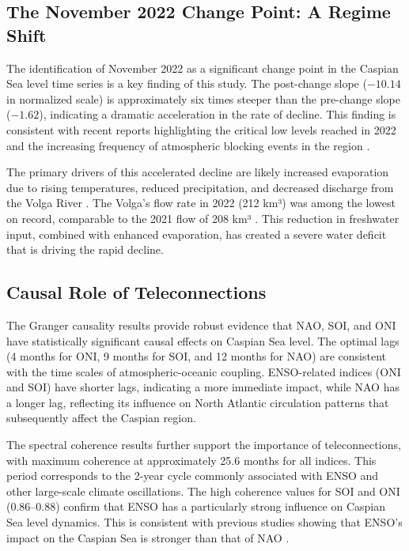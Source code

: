 \documentclass[12pt,a4paper,twocolumn]{article}
\begin{document}
\subsection{The November 2022 Change Point: A Regime Shift}

The identification of November 2022 as a significant change point in the Caspian Sea level time series is a key finding of this study. The post-change slope ($-10.14$ in normalized scale) is approximately six times steeper than the pre-change slope ($-1.62$), indicating a dramatic acceleration in the rate of decline. This finding is consistent with recent reports highlighting the critical low levels reached in 2022 and the increasing frequency of atmospheric blocking events in the region \citep{cabar2024, springer2025}.

The primary drivers of this accelerated decline are likely increased evaporation due to rising temperatures, reduced precipitation, and decreased discharge from the Volga River \citep{channelnewsasia2024}. The Volga's flow rate in 2022 (212 km³) was among the lowest on record, comparable to the 2021 flow of 208 km³ \citep{cabar2023}. This reduction in freshwater input, combined with enhanced evaporation, has created a severe water deficit that is driving the rapid decline.

\subsection{Causal Role of Teleconnections}

The Granger causality results provide robust evidence that NAO, SOI, and ONI have statistically significant causal effects on Caspian Sea level. The optimal lags (4 months for ONI, 9 months for SOI, and 12 months for NAO) are consistent with the time scales of atmospheric-oceanic coupling. ENSO-related indices (ONI and SOI) have shorter lags, indicating a more immediate impact, while NAO has a longer lag, reflecting its influence on North Atlantic circulation patterns that subsequently affect the Caspian region.

The spectral coherence results further support the importance of teleconnections, with maximum coherence at approximately 25.6 months for all indices. This period corresponds to the 2-year cycle commonly associated with ENSO and other large-scale climate oscillations. The high coherence values for SOI and ONI (0.86–0.88) confirm that ENSO has a particularly strong influence on Caspian Sea level dynamics. This is consistent with previous studies showing that ENSO's impact on the Caspian Sea is stronger than that of NAO \citep{openpolar2025}.
\end{document}
